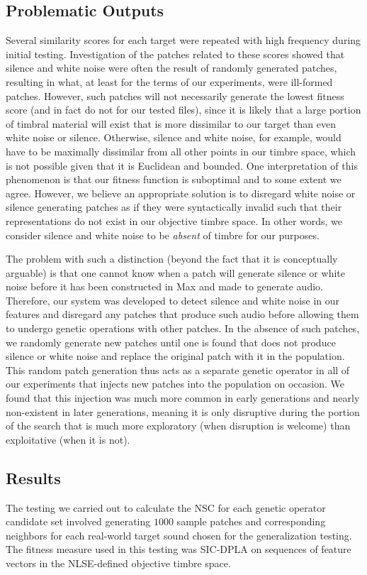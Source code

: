\documentclass[12pt]{report} 	%
\numberwithin{figure}{chapter}
\numberwithin{table}{chapter}
\numberwithin{equation}{chapter}
\begin{document}
\begin{flushleft}
\subsection{Problematic Outputs}
Several similarity scores for each target were repeated with high frequency during initial testing. Investigation of the patches related to these scores showed that silence and white noise were often the result of randomly generated patches, resulting in what, at least for the terms of our experiments, were ill-formed patches. However, such patches will not necessarily generate the lowest fitness score (and in fact do not for our tested files), since it is likely that a large portion of timbral material will exist that is more dissimilar to our target than even white noise or silence. Otherwise, silence and white noise, for example, would have to be maximally dissimilar from all other points in our timbre space, which is not possible given that it is Euclidean and bounded. One interpretation of this phenomenon is that our fitness function is suboptimal and to some extent we agree. However, we believe an appropriate solution is to disregard white noise or silence generating patches as if they were syntactically invalid such that their representations do not exist in our objective timbre space. In other words, we consider silence and white noise to be \textit{absent} of timbre for our purposes.

The problem with such a distinction (beyond the fact that it is conceptually arguable) is that one cannot know when a patch will generate silence or white noise before it has been constructed in Max and made to generate audio. Therefore, our system was developed to detect silence and white noise in our features and disregard any patches that produce such audio before allowing them to undergo genetic operations with other patches. In the absence of such patches, we randomly generate new patches until one is found that does not produce silence or white noise and replace the original patch with it in the population. This random patch generation thus acts as a separate genetic operator in all of our experiments that injects new patches into the population on occasion. We found that this injection was much more common in early generations and nearly non-existent in later generations, meaning it is only disruptive during the portion of the search that is much more exploratory (when disruption is welcome) than exploitative (when it is not).
\subsection{Results}
The testing we carried out to calculate the NSC for each genetic operator candidate set involved generating $1000$ sample patches and corresponding neighbors for each real-world target sound chosen for the generalization testing. The fitness measure used in this testing was SIC-DPLA on sequences of feature vectors in the NLSE-defined objective timbre space.


\end{flushleft}
\end{document}

